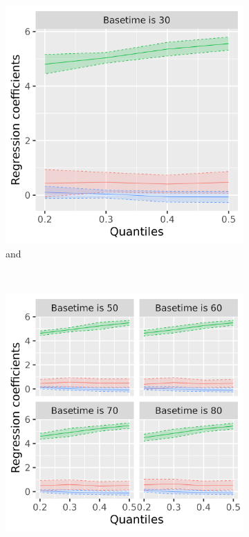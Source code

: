 \begin{figure}[ht]
\begin{subfigure}[b]{0.47\linewidth}
    \includegraphics[width = 1.0\textwidth]{realdata_nonsmooth_quantile.png}
    \caption{ and }    
    \label{fig:realdata_nonsmooth}
  \end{subfigure}
 \\[2ex]
  \begin{subfigure}[b]{0.47\linewidth}
    \includegraphics[width = 1.0\textwidth]{realdata_multi_quantile.png}

\end{subfigure}
\end{figure}
